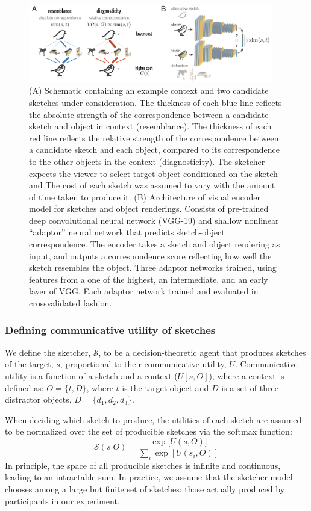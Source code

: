 \documentclass[9pt,twocolumn,twoside]{pnas-new}
\begin{document}
\begin{figure}[htbp]
\centering
\includegraphics[width=0.95\textwidth]{figures/4_model_schematic-min.pdf}
\caption{
(A) Schematic containing an example context and two candidate sketches under consideration. 
The thickness of each blue line reflects the absolute strength of the correspondence between a candidate sketch and object in context (resemblance). 
The thickness of each red line reflects the relative strength of the correspondence between a candidate sketch and each object, compared to its correspondence to the other objects in the context (diagnosticity). 
The sketcher expects the viewer to select target object conditioned on the sketch and 
The cost of each sketch was assumed to vary with the amount of time taken to produce it.
(B) Architecture of visual encoder model for sketches and object renderings. Consists of pre-trained deep convolutional neural network (VGG-19) and shallow nonlinear ``adaptor'' neural network that predicts sketch-object correspondence. 
The encoder takes a sketch and object rendering as input, and outputs a correspondence score reflecting how well the sketch resembles the object. 
Three adaptor networks trained, using features from a one of the highest, an intermediate, and an early layer of VGG.
Each adaptor network trained and evaluated in crossvalidated fashion.}
\label{model_schematic}
\end{figure}

\subsubsection*{Defining communicative utility of sketches}

We define the sketcher, $\mathcal{S}$, to be a decision-theoretic agent that produces sketches of the target, $s$, proportional to their communicative utility, $U$.
Communicative utility is a function of a sketch and a context ($U[s,O]$), where a context is defined as:
$O = \{t,D\}$, where $t$ is the target object and $D$ is a set of three distractor objects, $D=\{d_1,d_2,d_3\}$.  

When deciding which sketch to produce, the utilities of each sketch are assumed to be normalized over the set of producible sketches via the softmax function: 
\begin{equation} \label{sketcher_distribution}
\mathcal{S}(s|O) = \frac {\exp [{U(s,O)]}} {\sum_{i} {\exp [U(s_i,O)]}}
\end{equation}
In principle, the space of all producible sketches is infinite and continuous, leading to an intractable sum.
In practice, we assume that the sketcher model chooses among a large but finite set of sketches: those actually produced by participants in our experiment.
\end{document}
